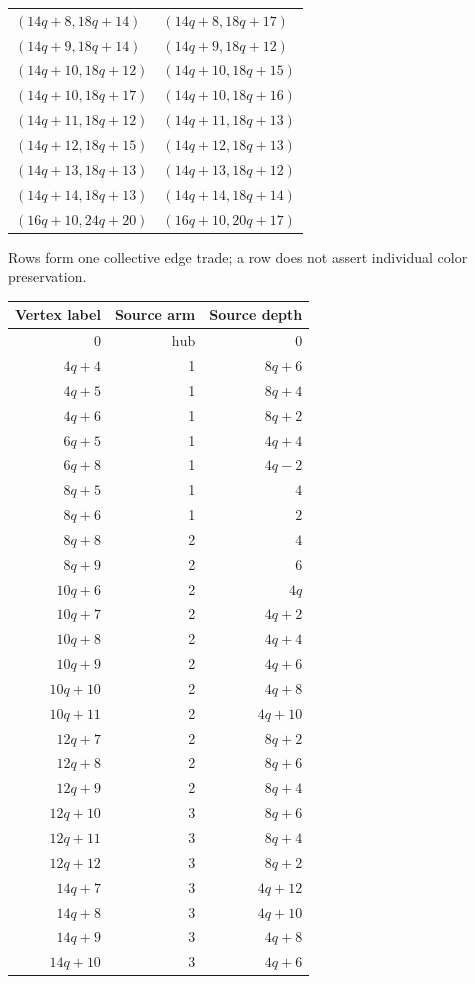 \begin{longtable}{ll}
$(14q+8,18q+14)$ & $(14q+8,18q+17)$\\
$(14q+9,18q+14)$ & $(14q+9,18q+12)$\\
$(14q+10,18q+12)$ & $(14q+10,18q+15)$\\
$(14q+10,18q+17)$ & $(14q+10,18q+16)$\\
$(14q+11,18q+12)$ & $(14q+11,18q+13)$\\
$(14q+12,18q+15)$ & $(14q+12,18q+13)$\\
$(14q+13,18q+13)$ & $(14q+13,18q+12)$\\
$(14q+14,18q+13)$ & $(14q+14,18q+14)$\\
$(16q+10,24q+20)$ & $(16q+10,20q+17)$\\
\end{longtable}
Rows form one collective edge trade; a row does not assert individual color preservation.
\begin{longtable}{rrr}
Vertex label & Source arm & Source depth\\\hline\endhead
$0$ & $\mathrm{hub}$ & $0$\\
$4q+4$ & 1 & $8q+6$\\
$4q+5$ & 1 & $8q+4$\\
$4q+6$ & 1 & $8q+2$\\
$6q+5$ & 1 & $4q+4$\\
$6q+8$ & 1 & $4q-2$\\
$8q+5$ & 1 & $4$\\
$8q+6$ & 1 & $2$\\
$8q+8$ & 2 & $4$\\
$8q+9$ & 2 & $6$\\
$10q+6$ & 2 & $4q$\\
$10q+7$ & 2 & $4q+2$\\
$10q+8$ & 2 & $4q+4$\\
$10q+9$ & 2 & $4q+6$\\
$10q+10$ & 2 & $4q+8$\\
$10q+11$ & 2 & $4q+10$\\
$12q+7$ & 2 & $8q+2$\\
$12q+8$ & 2 & $8q+6$\\
$12q+9$ & 2 & $8q+4$\\
$12q+10$ & 3 & $8q+6$\\
$12q+11$ & 3 & $8q+4$\\
$12q+12$ & 3 & $8q+2$\\
$14q+7$ & 3 & $4q+12$\\
$14q+8$ & 3 & $4q+10$\\
$14q+9$ & 3 & $4q+8$\\
$14q+10$ & 3 & $4q+6$\\

\end{longtable}
